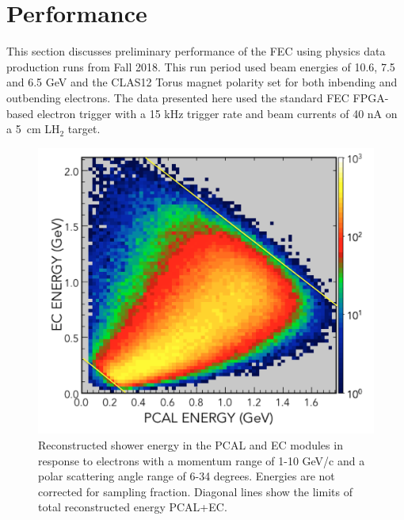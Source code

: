 \section{Performance}

This section discusses preliminary performance of the FEC using physics data production runs from Fall 2018.  This run period used beam energies of 10.6, 7.5 and 6.5 GeV and the CLAS12 Torus magnet polarity set for both inbending and outbending electrons.  The data presented here used the standard FEC FPGA-based electron trigger with a 15 kHz trigger rate and beam currents of 40 nA on a 5~cm LH$_2$ target.

\begin{figure}[hbt]
\centering
\includegraphics[width=1.0\columnwidth,keepaspectratio]{img/S10_1_000.png}
\caption[]{Reconstructed shower energy in the PCAL and EC modules in response to electrons with a momentum range of 1-10 GeV/c and a polar scattering angle range of 6-34 degrees.  Energies are not corrected for sampling fraction. Diagonal lines show the limits of total reconstructed energy PCAL+EC.}
\label{fig:S10_1_000}
\end{figure}

